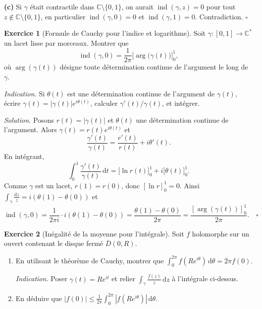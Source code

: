 \documentclass[12pt,a4paper,openany]{book}
\theoremstyle{definition}
\newtheorem{exercice}{Exercice}[chapter]
\theoremstyle{plain}
\theoremstyle{remark}
\newcommand{\C}{\mathbb{C}}
\DeclareMathOperator{\ind}{ind}
\newcommand{\dd}{\mathrm{d}}
\newcommand{\abs}[1]{\left|#1\right|}
\begin{document}
\textbf{(c)} Si $\gamma$ était contractile dans $\C\setminus\{0,1\}$, on
aurait $\ind(\gamma, z) = 0$ pour tout $z \notin \C\setminus\{0,1\}$, en
particulier $\ind(\gamma, 0) = 0$ et $\ind(\gamma, 1) = 0$. Contradiction.
\hfill$\square$

\bigskip

\begin{exercice}[Formule de Cauchy pour l'indice et logarithme]\label{exo:indice-log}
Soit $\gamma \colon [0,1] \to \C^*$ un lacet lisse par morceaux. Montrer que
\[
  \ind(\gamma, 0) = \frac{1}{2\pi}\bigl[\arg\bigl(\gamma(t)\bigr)\bigr]_0^1,
\]
où $\arg(\gamma(t))$ désigne toute détermination continue de l'argument le
long de $\gamma$.

\noindent\textit{Indication.} Si $\theta(t)$ est une détermination continue
de l'argument de $\gamma(t)$, écrire $\gamma(t) = \abs{\gamma(t)}e^{i\theta(t)}$,
calculer $\gamma'(t)/\gamma(t)$, et intégrer.
\end{exercice}

\noindent\textit{Solution.}\enspace
Posons $r(t) = \abs{\gamma(t)}$ et $\theta(t)$ une détermination continue
de l'argument. Alors $\gamma(t) = r(t)e^{i\theta(t)}$ et
\[
  \frac{\gamma'(t)}{\gamma(t)} = \frac{r'(t)}{r(t)} + i\theta'(t).
\]
En intégrant,
\[
  \int_0^1 \frac{\gamma'(t)}{\gamma(t)}\,\dd t
  = \bigl[\ln r(t)\bigr]_0^1 + i\bigl[\theta(t)\bigr]_0^1.
\]
Comme $\gamma$ est un lacet, $r(1) = r(0)$, donc $[\ln r]_0^1 = 0$. Ainsi
$\int_\gamma \frac{\dd z}{z} = i(\theta(1)-\theta(0))$ et
\[
  \ind(\gamma, 0) = \frac{1}{2\pi i}\cdot i(\theta(1)-\theta(0))
  = \frac{\theta(1)-\theta(0)}{2\pi} = \frac{[\arg(\gamma(t))]_0^1}{2\pi}.
  \quad\square
\]

\bigskip

\begin{exercice}[Inégalité de la moyenne pour l'intégrale]\label{exo:inegalite-moyenne}
Soit $f$ holomorphe sur un ouvert contenant le disque fermé
$\overline{D}(0,R)$.
\begin{enumerate}[label=\textup{(\alph*)}]
  \item En utilisant le théorème de Cauchy, montrer que
    $\displaystyle\int_0^{2\pi} f(Re^{i\theta})\,\dd\theta = 2\pi f(0)$.

    \noindent\textit{Indication.} Poser $\gamma(t) = Re^{it}$ et relier
    $\int_\gamma \frac{f(z)}{z}\,\dd z$ à l'intégrale ci-dessus.
  \item En déduire que $\displaystyle\abs{f(0)} \leq
    \frac{1}{2\pi}\int_0^{2\pi}\abs{f(Re^{i\theta})}\,\dd\theta$.
\end{enumerate}
\end{exercice}
\end{document}
